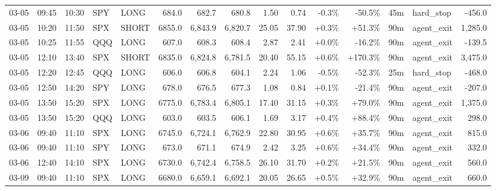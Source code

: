 \documentclass[11pt,a4paper,twoside]{article}
\begin{document}
\begin{landscape}
\begin{center}
\begin{longtable}{>{\color{txtmain}}l l l l l r r r r r r r r >{\color{txtmain}}l r}
03-05 & 09:45 & 10:30 & SPY & LONG & 684.0 & 682.7 & 680.8 & 1.50 & 0.74 & \textcolor{lossred}{-0.3\%} & \textcolor{lossred}{-50.5\%} & 45m & hard\_stop & \textcolor{lossred}{-456.0} \\
03-05 & 10:20 & 11:50 & SPX & SHORT & 6855.0 & 6,843.9 & 6,820.7 & 25.05 & 37.90 & \textcolor{wingreen}{+0.3\%} & \textcolor{wingreen}{+51.3\%} & 90m & agent\_exit & \textcolor{wingreen}{1,285.0} \\
03-05 & 10:25 & 11:55 & QQQ & LONG & 607.0 & 608.3 & 608.4 & 2.87 & 2.41 & \textcolor{wingreen}{+0.0\%} & \textcolor{lossred}{-16.2\%} & 90m & agent\_exit & \textcolor{lossred}{-139.5} \\
03-05 & 12:10 & 13:40 & SPX & SHORT & 6835.0 & 6,824.8 & 6,781.5 & 20.40 & 55.15 & \textcolor{wingreen}{+0.6\%} & \textcolor{wingreen}{+170.3\%} & 90m & agent\_exit & \textcolor{wingreen}{3,475.0} \\
03-05 & 12:20 & 12:45 & QQQ & LONG & 606.0 & 606.8 & 604.1 & 2.24 & 1.06 & \textcolor{lossred}{-0.5\%} & \textcolor{lossred}{-52.3\%} & 25m & hard\_stop & \textcolor{lossred}{-468.0} \\
03-05 & 12:50 & 14:20 & SPY & LONG & 678.0 & 676.5 & 677.3 & 1.08 & 0.84 & \textcolor{wingreen}{+0.1\%} & \textcolor{lossred}{-21.4\%} & 90m & agent\_exit & \textcolor{lossred}{-207.0} \\
03-05 & 13:50 & 15:20 & SPX & LONG & 6775.0 & 6,783.4 & 6,805.1 & 17.40 & 31.15 & \textcolor{wingreen}{+0.3\%} & \textcolor{wingreen}{+79.0\%} & 90m & agent\_exit & \textcolor{wingreen}{1,375.0} \\
03-05 & 13:50 & 15:20 & QQQ & LONG & 603.0 & 603.5 & 606.1 & 1.69 & 3.17 & \textcolor{wingreen}{+0.4\%} & \textcolor{wingreen}{+88.4\%} & 90m & agent\_exit & \textcolor{wingreen}{298.0} \\
03-06 & 09:40 & 11:10 & SPX & LONG & 6745.0 & 6,724.1 & 6,762.9 & 22.80 & 30.95 & \textcolor{wingreen}{+0.6\%} & \textcolor{wingreen}{+35.7\%} & 90m & agent\_exit & \textcolor{wingreen}{815.0} \\
03-06 & 09:40 & 11:10 & SPY & LONG & 673.0 & 671.1 & 674.9 & 2.42 & 3.25 & \textcolor{wingreen}{+0.6\%} & \textcolor{wingreen}{+34.4\%} & 90m & agent\_exit & \textcolor{wingreen}{332.0} \\
03-06 & 12:40 & 14:10 & SPX & LONG & 6730.0 & 6,742.4 & 6,758.5 & 26.10 & 31.70 & \textcolor{wingreen}{+0.2\%} & \textcolor{wingreen}{+21.5\%} & 90m & agent\_exit & \textcolor{wingreen}{560.0} \\
03-09 & 09:40 & 11:10 & SPX & LONG & 6680.0 & 6,659.1 & 6,692.1 & 20.05 & 26.65 & \textcolor{wingreen}{+0.5\%} & \textcolor{wingreen}{+32.9\%} & 90m & agent\_exit & \textcolor{wingreen}{660.0} \\

\end{longtable}
\end{center}
\end{landscape}
\end{document}
